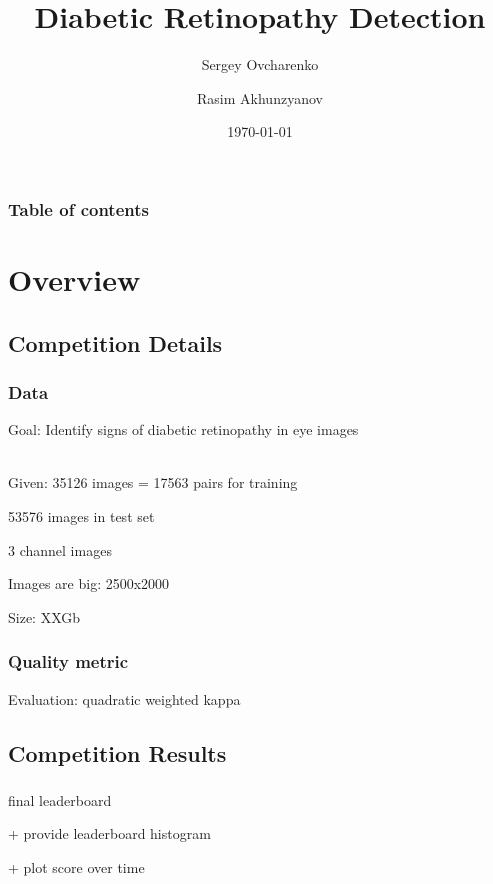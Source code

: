 \documentclass{beamer}
\begin{document}
\title{Diabetic Retinopathy Detection}
\subtitle{}  
\author[]{Sergey Ovcharenko  \and Rasim Akhunzyanov }

\date{\today} 

\begin{frame}
\titlepage
\end{frame}

\begin{frame}
\frametitle{Table of contents}\tableofcontents
\end{frame} 


\section{Overview} 

\subsection{Competition Details}
\begin{frame}\frametitle{Data} 
\par Goal: Identify signs of diabetic retinopathy in eye images \\~\\
\par Given: 35126 images = 17563 pairs for training
\par 53576 images in test set
\par 3 channel images
\par Images are big: 2500x2000
\par Size: XXGb
\end{frame}

\begin{frame}\frametitle{Quality metric} 
\par Evaluation: quadratic weighted kappa
\end{frame}

\subsection{Competition Results}
\begin{frame}\frametitle{} 
\par final leaderboard
\par + provide leaderboard histogram
\par + plot score over time
\end{frame}
\end{document}
